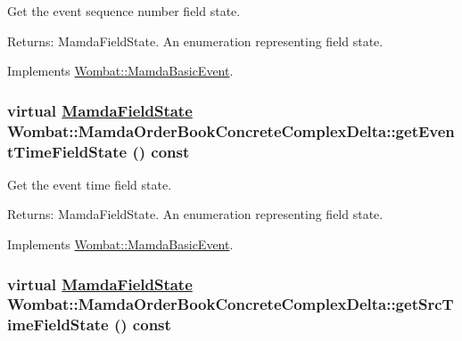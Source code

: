 Get the event sequence number field state. 

\begin{Desc}
\item[Returns:]Mamda\-Field\-State. An enumeration representing field state. \end{Desc}


Implements \hyperlink{classWombat_1_1MamdaBasicEvent_51cc0b9d4c2b8a982ccd18b339707cb5}{Wombat::Mamda\-Basic\-Event}.\hypertarget{classWombat_1_1MamdaOrderBookConcreteComplexDelta_4242850f2f309e4d770db4734b89254d}{
\subsubsection[getEventTimeFieldState]{\setlength{\rightskip}{0pt plus 5cm}virtual \hyperlink{namespaceWombat_93aac974f2ab713554fd12a1fa3b7d2a}{Mamda\-Field\-State} Wombat::Mamda\-Order\-Book\-Concrete\-Complex\-Delta::get\-Event\-Time\-Field\-State () const}}
\label{classWombat_1_1MamdaOrderBookConcreteComplexDelta_4242850f2f309e4d770db4734b89254d}


Get the event time field state. 

\begin{Desc}
\item[Returns:]Mamda\-Field\-State. An enumeration representing field state. \end{Desc}


Implements \hyperlink{classWombat_1_1MamdaBasicEvent_ff3932065e16e660fb6cd9285b46f7d0}{Wombat::Mamda\-Basic\-Event}.\hypertarget{classWombat_1_1MamdaOrderBookConcreteComplexDelta_673314cd0d612a82444d9dee126024b4}{
\subsubsection[getSrcTimeFieldState]{\setlength{\rightskip}{0pt plus 5cm}virtual \hyperlink{namespaceWombat_93aac974f2ab713554fd12a1fa3b7d2a}{Mamda\-Field\-State} Wombat::Mamda\-Order\-Book\-Concrete\-Complex\-Delta::get\-Src\-Time\-Field\-State () const}}
\label{classWombat_1_1MamdaOrderBookConcreteComplexDelta_673314cd0d612a82444d9dee126024b4}


